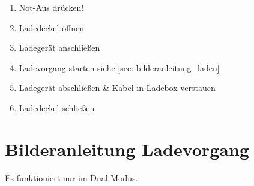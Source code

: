 \begin{enumerate}
    \item Not-Aus drücken!
    \item Ladedeckel öffnen
    \item Ladegerät anschließen
    \item Ladevorgang starten siehe \ref{sec: bilderanleitung_laden}
    \item Ladegerät abschließen \& Kabel in Ladebox verstauen
    \item Ladedeckel schließen
\end{enumerate}


\section{Bilderanleitung Ladevorgang \label{sec: bilderanleitung_laden}}
Es funktioniert nur im Dual-Modus.
